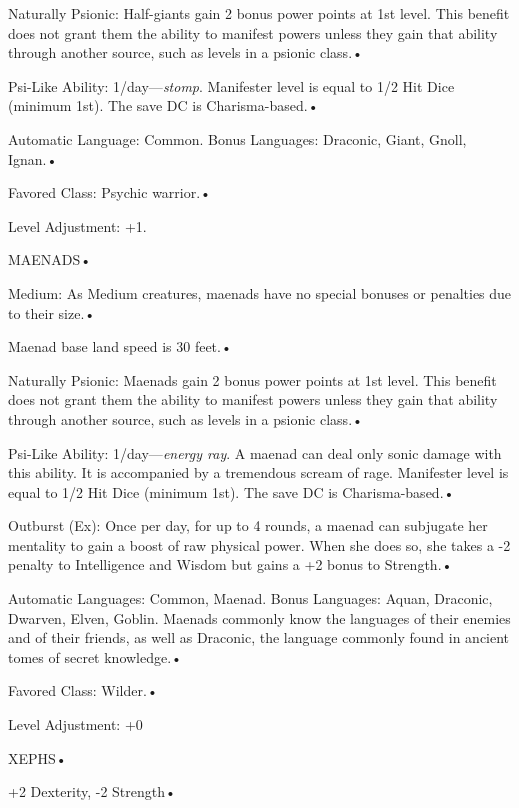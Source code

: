 \documentclass{article}
\begin{document}
\parindent=3pt
Naturally Psionic: Half-giants gain 2 bonus power points at 1st level. This benefit 
does not grant them the ability to manifest powers unless they gain that ability 
through another source, such as levels in a psionic class.• 

Psi-Like Ability: 1/day---\textit{stomp}. Manifester level is equal to 1/2 Hit 
Dice (minimum 1st). The save DC is Charisma-based.• 

Automatic Language: Common. Bonus Languages: Draconic, Giant, Gnoll, Ignan.• 

\parindent=7pt
Favored Class: Psychic warrior.• 

\parindent=3pt
Level Adjustment: +1.

\vspace{12pt}
\parindent=0pt
{\LARGE{}MAENADS• }

\parindent=3pt
Medium: As Medium creatures, maenads have no special bonuses or penalties due to 
their size.• 

Maenad base land speed is 30 feet.• 

\parindent=7pt
Naturally Psionic: Maenads gain 2 bonus power points at 1st level. This benefit 
does not grant them the ability to manifest powers unless they gain that ability 
through another source, such as levels in a psionic class.• 

\parindent=3pt
Psi-Like Ability: 1/day---\textit{energy ray}. A maenad can deal only sonic damage 
with this ability. It is accompanied by a tremendous scream of rage. Manifester 
level is equal to 1/2 Hit Dice (minimum 1st). The save DC is Charisma-based.• 

Outburst (Ex): Once per day, for up to 4 rounds, a maenad can subjugate her mentality 
to gain a boost of raw physical power. When she does so, she takes a -2 penalty 
to Intelligence and Wisdom but gains a +2 bonus to Strength.• 

\parindent=7pt
Automatic Languages: Common, Maenad. Bonus Languages: Aquan, Draconic, Dwarven, 
Elven, Goblin. Maenads commonly know the languages of their enemies and of their 
friends, as well as Draconic, the language commonly found in ancient tomes of secret 
knowledge.• 

\parindent=3pt
Favored Class: Wilder.• 

Level Adjustment: +0

\vspace{12pt}
\parindent=0pt
{\LARGE{}XEPHS• }

\parindent=3pt
+2 Dexterity, -2 Strength• 
\end{document}
